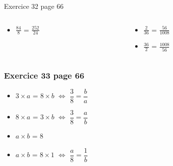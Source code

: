 \documentclass[xcolor={dvipsnames}]{beamer}
\begin{document}
\begin{frame}
\begin{block}{Exercice 32 page 66}
\begin{columns}
\begin{column}{0.25\textwidth}
\begin{LARGE}
\begin{itemize}
						\item $\frac{84}{8}$ = $\frac{252}{24}$\pause			
					\end{itemize}	
				\end{LARGE}
				
			\end{column}
			
			\begin{column}{0.25\textwidth}
				\begin{LARGE}
					\begin{itemize}
						\item $\frac{2}{36}$ = $\frac{56}{1008}$					
						
						\item $\frac{36}{2}$ = $\frac{1008}{56}$
					\end{itemize}	
				\end{LARGE}
				
			\end{column}
		\end{columns}
	\end{block}
	
\end{frame}

\begin{frame}
	\frametitle{Exercice 33 page 66}
	
	\begin{LARGE}
		\begin{itemize}
			\setlength\itemsep{1em}
			\item $3 \times a$ = $8 \times b$ $\Leftrightarrow$ $\dfrac{3}{8} = \dfrac{b}{a}$    \pause
			
			\item $8 \times a$ = $3 \times b$ $\Leftrightarrow$ $\dfrac{3}{8} = \dfrac{a}{b}$     \pause
			
			\item<3> $a \times b$ = $8$  \pause
			
			\item<4> $a \times b$ = $8 \times 1$ $\Leftrightarrow$ $\dfrac{a}{8} = \dfrac{1}{b}$     \pause
		\end{itemize}
	\end{LARGE}
	
\end{frame}
\end{document}
